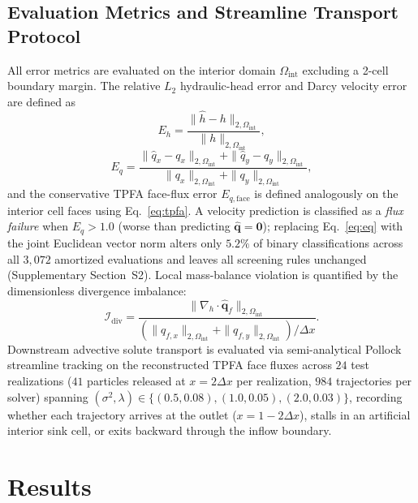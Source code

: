 \documentclass[preprint,12pt,authoryear]{elsarticle}
\begin{document}
\subsection{Evaluation Metrics and Streamline Transport Protocol}
\label{sec:metrics}

All error metrics are evaluated on the interior domain $\Omega_{\text{int}}$ excluding a 2-cell boundary margin. The relative $L_2$ hydraulic-head error and Darcy velocity error are defined as
\begin{equation}
  E_h = \frac{\|\hat{h} - h\|_{2, \Omega_{\text{int}}}}{\|h\|_{2, \Omega_{\text{int}}}},
  \label{eq:eh}
\end{equation}
\begin{equation}
  E_q = \frac{\|\hat{q}_x - q_x\|_{2, \Omega_{\text{int}}} + \|\hat{q}_y - q_y\|_{2, \Omega_{\text{int}}}}{\|q_x\|_{2, \Omega_{\text{int}}} + \|q_y\|_{2, \Omega_{\text{int}}}},
  \label{eq:eq}
\end{equation}
and the conservative TPFA face-flux error $E_{q,\text{face}}$ is defined analogously on the interior cell faces using Eq.~\eqref{eq:tpfa}. A velocity prediction is classified as a \textit{flux failure} when $E_q > 1.0$ (worse than predicting $\hat{\mathbf{q}} = \mathbf{0}$); replacing Eq.~\eqref{eq:eq} with the joint Euclidean vector norm alters only $5.2\%$ of binary classifications across all $3{,}072$ amortized evaluations and leaves all screening rules unchanged (Supplementary Section~S2). Local mass-balance violation is quantified by the dimensionless divergence imbalance:
\begin{equation}
  \mathcal{I}_{\text{div}} = \frac{\|\nabla_h \cdot \hat{\mathbf{q}}_f\|_{2, \Omega_{\text{int}}}}{(\|q_{f,x}\|_{2, \Omega_{\text{int}}} + \|q_{f,y}\|_{2, \Omega_{\text{int}}}) / \Delta x}.
  \label{eq:idiv}
\end{equation}
Downstream advective solute transport is evaluated via semi-analytical Pollock streamline tracking \citep{pollock1988} on the reconstructed TPFA face fluxes across $24$ test realizations ($41$ particles released at $x = 2\Delta x$ per realization, $984$ trajectories per solver) spanning $(\sigma^2, \lambda) \in \{(0.5, 0.08), (1.0, 0.05), (2.0, 0.03)\}$, recording whether each trajectory arrives at the outlet ($x = 1 - 2\Delta x$), stalls in an artificial interior sink cell, or exits backward through the inflow boundary.

\section{Results}
\label{sec:results}
\end{document}
